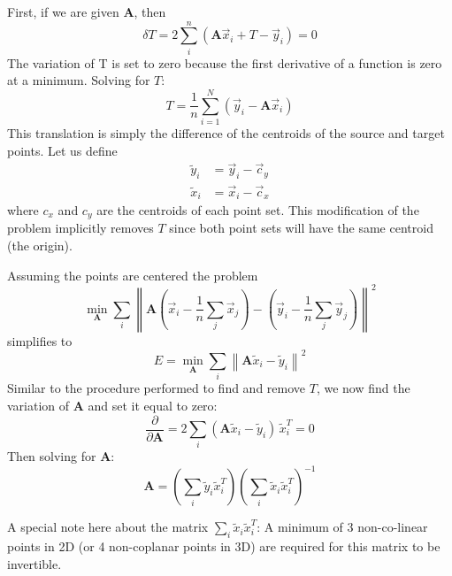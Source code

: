 First, if we are given $\mathbf{A}$, then 
\begin{equation}
\delta T = 2 \sum_i^n \left(\mathbf{A}\vec{x}_i + T-\vec{y}_i\right) = 0
\end{equation}
The variation of T is set to zero because the first derivative of a function is zero at a minimum.
Solving for $T$:
\begin{equation}
T=\frac{1}{n}\sum_{i=1}^N \left(\vec{y}_i-\mathbf{A}\vec{x}_i\right)
\end{equation}
This translation is simply the difference of the centroids of the source and target points. Let us define
\begin{align}
\tilde{y}_i &= \vec{y}_i - \vec{c}_y\\
\tilde{x}_i &= \vec{x}_i - \vec{c}_x
\end{align}
where $c_x$ and $c_y$ are the centroids of each point set. This modification of the problem implicitly removes $T$ since both point sets will have the same centroid (the origin).

Assuming the points are centered the problem
\begin{equation}
\underset{\mathbf{A}}{\min}\sum_i\left\|\mathbf{A}\left(\vec{x}_i-\frac{1}{n}\sum_j \vec{x}_j\right) - \left(\vec{y}_i-\frac{1}{n}\sum_j \vec{y}_j\right)\right\|^2
\end{equation}
simplifies to
\begin{equation}
E = \underset{\mathbf{A}}{\min}\sum_i\left\|\mathbf{A}\tilde{x}_i - \tilde{y}_i\right\|^2 
\end{equation}
Similar to the procedure performed to find and remove $T$, we now find the variation of $\mathbf{A}$ and set it equal to zero:
\begin{equation}
\frac{\partial}{\partial\mathbf{A}} = 2 \sum_i \left(\mathbf{A}\tilde{x}_i-\tilde{y}_i\right)\, \tilde{x}_i^T = 0
\end{equation}
Then solving for $\mathbf{A}$:
\begin{equation}
\mathbf{A}=\left(\sum_i\tilde{y}_i\tilde{x}_i^T\right)\left(\sum_i\tilde{x}_i\tilde{x}_i^T\right)^{-1}
\end{equation}

A special note here about the matrix $\sum_i\tilde{x}_i\tilde{x}_i^T$: A minimum of 3 non-co-linear points in 2D (or 4 non-coplanar points in 3D) are required for this matrix to be invertible. 

